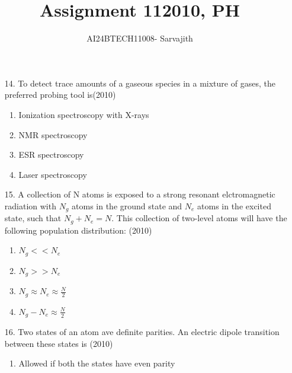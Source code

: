 \documentclass[journal]{IEEEtran}
\begin{document}

\vspace{3cm}


\author{AI24BTECH11008- Sarvajith
}
\title{Assignment 11}
{\let\newpage\relax\maketitle}
\title{2010, PH}
\renewcommand{\thefigure}{\theenumi}
\renewcommand{\thetable}{\theenumi}
\setlength{\intextsep}{10pt} %
\renewcommand{\thetable}{\theenumi}
\begin{enumerate}
    \item[14.] To detect trace amounts of a gaseous species in a mixture of gases, the preferred probing tool is\hfill (2010)
    \begin{enumerate}[label=(\Alph*)]
        \item Ionization spectroscopy with X-rays
        \item NMR spectroscopy
        \item ESR spectroscopy
        \item Laser spectroscopy
    \end{enumerate}
    \item[15.] A collection of N atoms is exposed to a strong resonant elctromagnetic radiation with $N_g$ atoms in the ground state and $N_e$ atoms in the excited state, such that $N_g+N_e = N$. This collection of two-level atoms will have the following population distribution: \hfill (2010)
    \begin{enumerate}[label=(\Alph*)]
        \item $N_g<<N_e$
        \item $N_g>>N_e$
        \item $N_g\approx N_e\approx \frac{N}{2}$
        \item $N_g-N_e\approx \frac{N}{2}$
    \end{enumerate}
    \item[16.] Two states of an atom ave definite parities. An electric dipole transition between these states is \hfill (2010)
    \begin{enumerate}[label=(\Alph*)]
        \item Allowed if both the states have even parity

\end{enumerate}
\end{enumerate}
\end{document}
